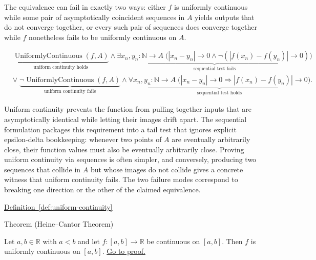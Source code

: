 \begin{remark*}
The equivalence can fail in exactly two ways: either $f$ is uniformly continuous while some pair of asymptotically coincident sequences in $A$ yields outputs that do not converge together, or every such pair of sequences does converge together while $f$ nonetheless fails to be uniformly continuous on $A$.
\end{remark*}

\begin{remark*}
\[
\begin{aligned}
&\underbrace{\operatorname{UniformlyContinuous}(f,A)}_{\text{uniform continuity holds}}
\land
\underbrace{\exists x_n,y_n:\mathbb{N}\to A\;
\bigl(|x_n - y_n| \to 0 \land \neg(|f(x_n) - f(y_n)| \to 0)\bigr)}_{\text{sequential test fails}}\\
&\lor\;
\underbrace{\neg \operatorname{UniformlyContinuous}(f,A)}_{\text{uniform continuity fails}}
\land
\underbrace{\forall x_n,y_n:\mathbb{N}\to A\;
\bigl(|x_n - y_n| \to 0 \Rightarrow |f(x_n) - f(y_n)| \to 0\bigr)}_{\text{sequential test holds}}.
\end{aligned}
\]
\end{remark*}

\begin{remark*}[Interpretation]
Uniform continuity prevents the function from pulling together inputs that are asymptotically identical while letting their images drift apart. The sequential formulation packages this requirement into a tail test that ignores explicit epsilon-delta bookkeeping: whenever two points of $A$ are eventually arbitrarily close, their function values must also be eventually arbitrarily close. Proving uniform continuity via sequences is often simpler, and conversely, producing two sequences that collide in $A$ but whose images do not collide gives a concrete witness that uniform continuity fails. The two failure modes correspond to breaking one direction or the other of the claimed equivalence.
\end{remark*}

\begin{dependencies}
\hyperref[def:uniform-continuity]{Definition~\ref*{def:uniform-continuity}}
\end{dependencies}


\begin{theorembox}{Theorem (Heine--Cantor Theorem)}
\begin{theorem}
\label{thm:heine-cantor}
Let $a,b \in \mathbb{R}$ with $a<b$ and let $f:[a,b]\to\mathbb{R}$ be continuous on $[a,b]$. Then $f$ is uniformly continuous on $[a,b]$.
\hyperref[prf:heine-cantor]{Go to proof.}
\end{theorem}
\end{theorembox}

